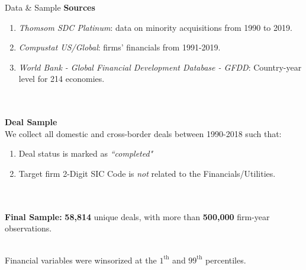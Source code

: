 \documentclass[10pt]{beamer}
\begin{document}
\begin{frame}{Data \& Sample}
    \textbf{Sources}    
     \begin{enumerate}
        \item \textit{Thomsom SDC Platinum}: data on minority acquisitions from 1990 to 2019.
        \item \textit{Compustat US/Global}: firms' financials from 1991-2019. 
        \item \textit{World Bank - Global Financial Development Database - GFDD}: Country-year level for 214 economies.
    \end{enumerate}
     \\~\\
    \textbf{Deal Sample} \\
    We collect all domestic and cross-border deals between 1990-2018 such that:
    \begin{enumerate}
        \item Deal status is marked as \textit{``completed"}
        \item Target firm 2-Digit SIC Code is \textit{not} related to the Financials/Utilities.
    \end{enumerate}
     \\~\\
     \textbf{Final Sample:} \textbf{58,814} unique deals, with more than \textbf{500,000} firm-year observations.
    \\~\\
    \item Financial variables were winsorized at the $1^{\text{th}}$ and $99^{\text{th}}$ percentiles.
\end{frame}

\end{document}
